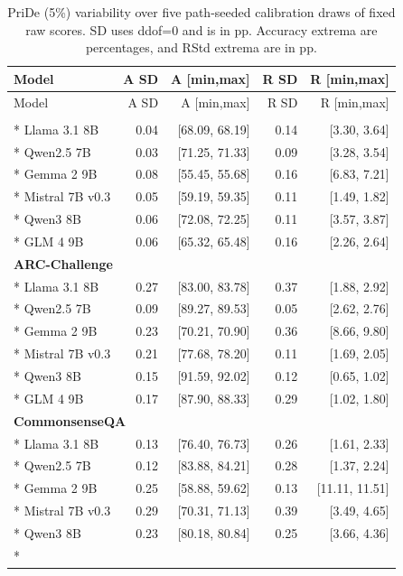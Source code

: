 \begingroup\small\setlength{\tabcolsep}{4pt}
\begin{longtable}{lrrrr}
\caption{PriDe (5\%) variability over five path-seeded calibration draws of fixed raw scores. SD uses ddof=0 and is in pp. Accuracy extrema are percentages, and RStd extrema are in pp. }\label{tab:calibration-variability}\\
\toprule
Model & A SD & A [min,max] & R SD & R [min,max]\\\midrule
\endfirsthead
\toprule
Model & A SD & A [min,max] & R SD & R [min,max]\\\midrule\endhead
\bottomrule\endfoot
\multicolumn{5}{l}{\textbf{MMLU}}\\*
Llama 3.1 8B & 0.04 & [68.09, 68.19] & 0.14 & [3.30, 3.64]\\*
Qwen2.5 7B & 0.03 & [71.25, 71.33] & 0.09 & [3.28, 3.54]\\*
Gemma 2 9B & 0.08 & [55.45, 55.68] & 0.16 & [6.83, 7.21]\\*
Mistral 7B v0.3 & 0.05 & [59.19, 59.35] & 0.11 & [1.49, 1.82]\\*
Qwen3 8B & 0.06 & [72.08, 72.25] & 0.11 & [3.57, 3.87]\\*
GLM 4 9B & 0.06 & [65.32, 65.48] & 0.16 & [2.26, 2.64]\\
\multicolumn{5}{l}{\textbf{ARC-Challenge}}\\*
Llama 3.1 8B & 0.27 & [83.00, 83.78] & 0.37 & [1.88, 2.92]\\*
Qwen2.5 7B & 0.09 & [89.27, 89.53] & 0.05 & [2.62, 2.76]\\*
Gemma 2 9B & 0.23 & [70.21, 70.90] & 0.36 & [8.66, 9.80]\\*
Mistral 7B v0.3 & 0.21 & [77.68, 78.20] & 0.11 & [1.69, 2.05]\\*
Qwen3 8B & 0.15 & [91.59, 92.02] & 0.12 & [0.65, 1.02]\\*
GLM 4 9B & 0.17 & [87.90, 88.33] & 0.29 & [1.02, 1.80]\\
\multicolumn{5}{l}{\textbf{CommonsenseQA}}\\*
Llama 3.1 8B & 0.13 & [76.40, 76.73] & 0.26 & [1.61, 2.33]\\*
Qwen2.5 7B & 0.12 & [83.88, 84.21] & 0.28 & [1.37, 2.24]\\*
Gemma 2 9B & 0.25 & [58.88, 59.62] & 0.13 & [11.11, 11.51]\\*
Mistral 7B v0.3 & 0.29 & [70.31, 71.13] & 0.39 & [3.49, 4.65]\\*
Qwen3 8B & 0.23 & [80.18, 80.84] & 0.25 & [3.66, 4.36]\\*

\end{longtable}
